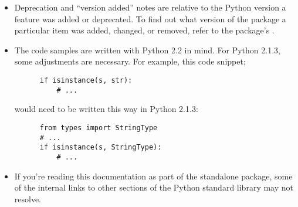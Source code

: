 \documentclass{howto}
\begin{document}
\begin{itemize}
\item Deprecation and ``version added'' notes are relative to the
      Python version a feature was added or deprecated.  To find out
      what version of the  package a particular item was
      added, changed, or removed, refer to the package's
      .

\item The code samples are written with Python 2.2 in mind.  For
      Python 2.1.3, some adjustments are necessary.  For example, this
      code snippet;

      \begin{verbatim}
      if isinstance(s, str):
          # ...
      \end{verbatim}

      would need to be written this way in Python 2.1.3:

      \begin{verbatim}
      from types import StringType
      # ...
      if isinstance(s, StringType):
          # ...
      \end{verbatim}

\item If you're reading this documentation as part of the
      standalone  package, some of the internal links to
      other sections of the Python standard library may not resolve.

\end{itemize}


\end{document}
